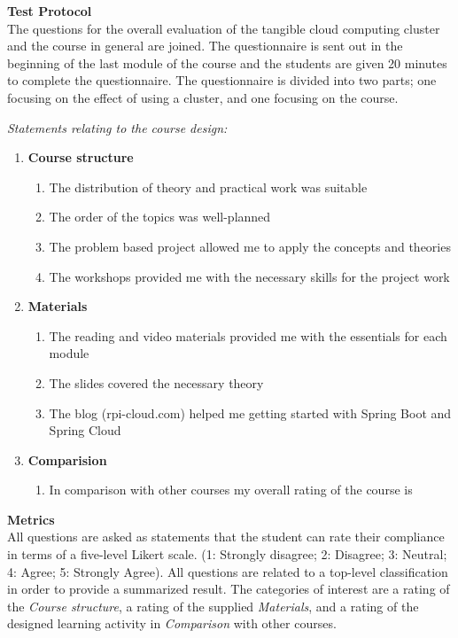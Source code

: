 \noindent\textbf{Test Protocol} \\
The questions for the overall evaluation of the tangible cloud computing cluster and the course in general are joined. The questionnaire is sent out in the beginning of the last module of the course and the students are given 20 minutes to complete the questionnaire. The questionnaire is divided into two parts; one focusing on the effect of using a cluster, and one focusing on the course.

\noindent\textit{Statements relating to the course design:}
\noindent\begin{enumerate}
	\item\textbf{Course structure}
	\vspace{-4mm}
	\begin{enumerate}
	    \setlength\itemsep{0.05em}
		\item The distribution of theory and practical work was suitable
		\item The order of the topics was well-planned
		\item The problem based project allowed me to apply the concepts and theories
		\item The workshops provided me with the necessary skills for the project work
	\end{enumerate}
	
	\item\textbf{Materials}
	\vspace{-4mm}
	\begin{enumerate}
	    \setlength\itemsep{0.05em}
		\item The reading and video materials provided me with the essentials for each module
		\item The slides covered the necessary theory
		\item The blog (rpi-cloud.com) helped me getting started with Spring Boot and Spring Cloud
	\end{enumerate}
	
	\item\textbf{Comparision}
	\vspace{-4mm}
	\begin{enumerate}
	    \setlength\itemsep{0.05em}
		\item In comparison with other courses my overall rating of the course is
	\end{enumerate}
\end{enumerate}


\noindent\textbf{Metrics} \\
All questions are asked as statements that the student can rate their compliance in terms of a five-level Likert scale. (1: Strongly disagree; 2: Disagree; 3: Neutral; 4: Agree; 5: Strongly Agree). All questions are related to a top-level classification in order to provide a summarized result. The categories of interest are a rating of the \textit{Course structure}, a rating of the supplied \textit{Materials}, and a rating of the designed learning activity in \textit{Comparison} with other courses. \\
\noindent 

